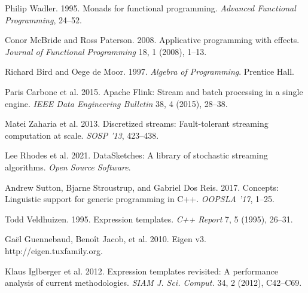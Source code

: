 \documentclass[sigconf]{acmart}
\begin{document}
\begin{thebibliography}{99}
Philip Wadler. 1995.
Monads for functional programming.
\textit{Advanced Functional Programming}, 24--52.

Conor McBride and Ross Paterson. 2008.
Applicative programming with effects.
\textit{Journal of Functional Programming} 18, 1 (2008), 1--13.

Richard Bird and Oege de Moor. 1997.
\textit{Algebra of Programming}.
Prentice Hall.

Paris Carbone et al. 2015.
Apache Flink: Stream and batch processing in a single engine.
\textit{IEEE Data Engineering Bulletin} 38, 4 (2015), 28--38.

Matei Zaharia et al. 2013.
Discretized streams: Fault-tolerant streaming computation at scale.
\textit{SOSP '13}, 423--438.

Lee Rhodes et al. 2021.
DataSketches: A library of stochastic streaming algorithms.
\textit{Open Source Software}.

Andrew Sutton, Bjarne Stroustrup, and Gabriel Dos Reis. 2017.
Concepts: Linguistic support for generic programming in C++.
\textit{OOPSLA '17}, 1--25.

Todd Veldhuizen. 1995.
Expression templates.
\textit{C++ Report} 7, 5 (1995), 26--31.

Gaël Guennebaud, Benoît Jacob, et al. 2010.
Eigen v3.
http://eigen.tuxfamily.org.

Klaus Iglberger et al. 2012.
Expression templates revisited: A performance analysis of current methodologies.
\textit{SIAM J. Sci. Comput.} 34, 2 (2012), C42--C69.

\end{thebibliography}
\end{document}
